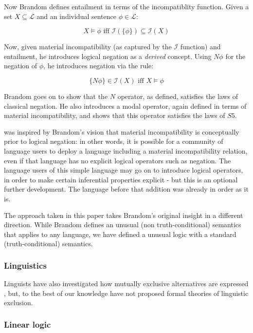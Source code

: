 \NI Now Brandom defines entailment in terms of the incompatiblity
function. Given a set $X \subseteq \mathcal{L}$ and an individual
sentence $\phi \in \mathcal{L}$:

\[
   X \models \phi \text{ iff } \mathcal{I}(\{\phi\}) \subseteq \mathcal{I}(X)
\]

\NI Now, given material incompatibility (as captured by the
$\mathcal{I}$ function) and entailment, he introduces logical negation
as a \emph{derived} concept. Using $N \phi$ for the negation of
$\phi$, he introduces negation via the rule:

\[
   \{N \phi\} \in \mathcal{I}(X) \text{ iff } X \models \phi
\]

\NI Brandom goes on to show that the $N$ operator, as defined, satisfies
the laws of classical negation.  He also introduces a modal operator,
again defined in terms of material incompatibility, and shows that
this operator satisfies the laws of $S5$.

\ELFULL{} was inspired by Brandom's vision that material
incompatibility is conceptually prior to logical negation: in other
words, it is possible for a community of language users to deploy a
language including a material incompatibility relation, even if that
language has no explicit logical operators such as negation.  The
language users of this simple language may go on to introduce logical
operators, in order to make certain inferential properties explicit -
but this is an optional further development.  The language before that
addition was already in order as it is.

The approach taken in this paper takes Brandom's original insight in a
different direction.  While Brandom defines an unusual (non
truth-conditional) semantics that applies to any language, we have
defined a unusual logic with a standard (truth-conditional) semantics.

\subsubsection{Linguistics}

Linguists have also investigated how mutually exclusive alternatives
are expressed \cite{OKeeffeA:rouhanocl}, but, to the best of our
knowledge have not proposed formal theories of linguistic exclusion.

\subsubsection{Linear logic}

